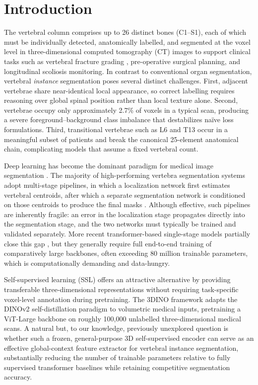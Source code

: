 \documentclass[preprint,12pt,3p]{elsarticle}
\begin{document}
\linenumbers

\section{Introduction}
\label{sec:intro}

The vertebral column comprises up to 26 distinct bones (C1--S1), each of which must be individually detected, anatomically labelled, and segmented at the voxel level in three-dimensional computed tomography (CT) images to support clinical tasks such as vertebral fracture grading \cite{sekuboyina2022}, pre-operative surgical planning, and longitudinal scoliosis monitoring. In contrast to conventional organ segmentation, vertebral \emph{instance} segmentation poses several distinct challenges. First, adjacent vertebrae share near-identical local appearance, so correct labelling requires reasoning over global spinal position rather than local texture alone. Second, vertebrae occupy only approximately 2.7\% of voxels in a typical scan, producing a severe foreground--background class imbalance that destabilizes na\"ive loss formulations. Third, transitional vertebrae such as L6 and T13 occur in a meaningful subset of patients and break the canonical 25-element anatomical chain, complicating models that assume a fixed vertebral count.

Deep learning has become the dominant paradigm for medical image segmentation \cite{ronneberger2015,hatamizadeh2022}. The majority of high-performing vertebra segmentation systems adopt multi-stage pipelines, in which a localization network first estimates vertebral centroids, after which a separate segmentation network is conditioned on those centroids to produce the final masks \cite{payer2020,chen2020}. Although effective, such pipelines are inherently fragile: an error in the localization stage propagates directly into the segmentation stage, and the two networks must typically be trained and validated separately. More recent transformer-based single-stage models partially close this gap \cite{yang2023,vertdetect2023,montpetit2025}, but they generally require full end-to-end training of comparatively large backbones, often exceeding 80 million trainable parameters, which is computationally demanding and data-hungry.

Self-supervised learning (SSL) offers an attractive alternative by providing transferable three-dimensional representations without requiring task-specific voxel-level annotation during pretraining. The 3DINO framework \cite{xu2025_3dino} adapts the DINOv2 self-distillation paradigm \cite{oquab2023} to volumetric medical inputs, pretraining a ViT-Large backbone on roughly 100{,}000 unlabelled three-dimensional medical scans. A natural but, to our knowledge, previously unexplored question is whether such a frozen, general-purpose 3D self-supervised encoder can serve as an effective global-context feature extractor for vertebral instance segmentation, substantially reducing the number of trainable parameters relative to fully supervised transformer baselines while retaining competitive segmentation accuracy.
\end{document}

